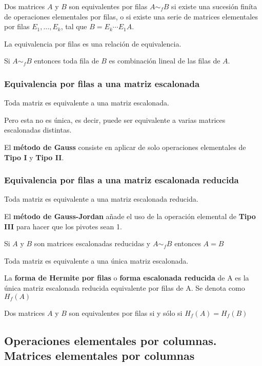 Dos matrices $A$ y $B$ son equivalentes por filas $A \sim_f B$ si existe una sucesión finíta de operaciones elementales por filas, o si existe una serie de matrices elementales por filas $E_1,\ldots,E_k$, tal que $B=E_k\cdots E_1 A$.


La equivalencia por filas es una relación de equivalencia.



Si $A \sim_f B$ entonces toda fila de $B$ es combinación lineal de las filas de $A$.


\subsubsection{Equivalencia por filas a una matriz escalonada}


Toda matriz es equivalente a una matriz escalonada. 


Pero esta no es única, es decir, puede ser equivalente a varias matrices escalonadas distintas.

El \textbf{método de Gauss} consiste en aplicar de solo operaciones elementales de \textbf{Tipo I} y \textbf{Tipo II}.

\subsubsection{Equivalencia por filas a una matriz escalonada reducida}


Toda matriz es equivalente a una matriz escalonada reducida.


El \textbf{método de Gauss-Jordan} añade el uso de la operación elemental de \textbf{Tipo III} para hacer que los pivotes sean 1.


Si $A$ y $B$ son matrices escalonadas reducidas y $A \sim_f B$ entonces $A=B$



Toda matriz es equivalente a una única matriz escalonada.


La \textbf{forma de Hermite por filas} o \textbf{forma escalonada reducida} de A es la única matriz escalonada reducida equivalente por filas de A. Se denota como $H_f(A)$


Dos matrices $A$ y $B$ son equivalentes por filas si y sólo si $H_f(A)=H_f(B)$


\subsection{Operaciones elementales por columnas. Matrices elementales por columnas}

